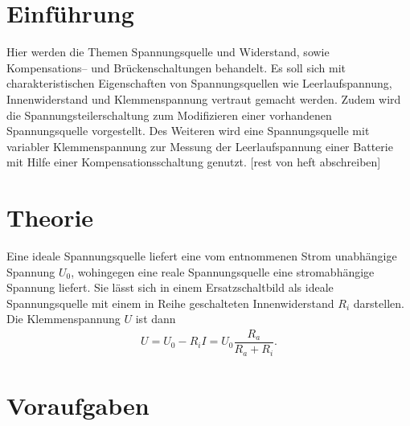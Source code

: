 \documentclass[a4paper,12pt]{article}
\numberwithin{equation}{section}
\begin{document}

\title{}
\author{}
\maketitle
{}


\newpage


\fancyhead[L]{\thepage}
\fancyfoot[C]{}

\tableofcontents


\newpage


\fancyhead[R]{\leftmark\\\rightmark}

\section{Einführung}
Hier werden die Themen \glqq Spannungsquelle\grqq{} und \glqq Widerstand\grqq{}, sowie Kompensations-- und Brückenschaltungen behandelt. Es soll sich mit charakteristischen Eigenschaften von Spannungsquellen wie Leerlaufspannung, Innenwiderstand und Klemmenspannung vertraut gemacht werden. Zudem wird die Spannungsteilerschaltung zum Modifizieren einer vorhandenen Spannungsquelle vorgestellt. Des Weiteren wird eine Spannungsquelle mit variabler Klemmenspannung zur Messung der Leerlaufspannung einer Batterie mit Hilfe einer Kompensationsschaltung genutzt. [rest von heft abschreiben]

\newpage
\section{Theorie}
Eine ideale Spannungsquelle liefert eine vom entnommenen Strom unabhängige Spannung $U_0$, wohingegen eine reale Spannungsquelle eine stromabhängige Spannung liefert. Sie lässt sich in einem Ersatzschaltbild als ideale Spannungsquelle mit einem in Reihe geschalteten Innenwiderstand $R_i$ darstellen. Die Klemmenspannung $U$ ist dann
\begin{align} 
        U=U_0-R_iI=U_0\dfrac{R_a}{R_a+R_i}
.\end{align} 


\newpage
\section{Voraufgaben}
\end{document}
